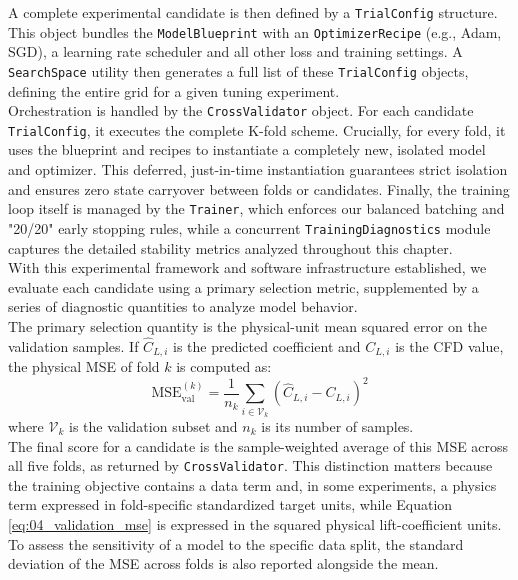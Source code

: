 A complete experimental candidate is then defined by a \texttt{TrialConfig} structure. This object bundles the \texttt{ModelBlueprint} with an \texttt{OptimizerRecipe} (e.g., Adam, SGD), a learning rate scheduler and all other loss and training settings. A \texttt{SearchSpace} utility then generates a full list of these \texttt{TrialConfig} objects, defining the entire grid for a given tuning experiment.\\

Orchestration is handled by the \texttt{CrossValidator} object. For each candidate \texttt{TrialConfig}, it executes the complete K-fold scheme. Crucially, for every fold, it uses the blueprint and recipes to instantiate a completely new, isolated model and optimizer. This deferred, just-in-time instantiation guarantees strict isolation and ensures zero state carryover between folds or candidates. Finally, the training loop itself is managed by the \texttt{Trainer}, which enforces our balanced batching and "20/20" early stopping rules, while a concurrent \texttt{TrainingDiagnostics} module captures the detailed stability metrics analyzed throughout this chapter.\\

With this experimental framework and software infrastructure established, we evaluate each candidate using a primary selection metric, supplemented by a series of diagnostic quantities to analyze model behavior.\\

The primary selection quantity is the physical-unit mean squared error on the validation samples. If $\hat{C}_{L,i}$ is the predicted coefficient and $C_{L,i}$ is the CFD value, the physical MSE of fold $k$ is computed as:
\begin{equation}
    \mathrm{MSE}_{\mathrm{val}}^{(k)} =
    \frac{1}{n_k}\sum_{i\in\mathcal{V}_k}
    \left(\hat{C}_{L,i}-C_{L,i}\right)^2
    \label{eq:04_validation_mse}
\end{equation}
where $\mathcal{V}_k$ is the validation subset and $n_k$ is its number of samples.\\

The final score for a candidate is the sample-weighted 
average of this MSE across all five folds, as returned by \texttt{CrossValidator}. This distinction matters because the training objective contains a data term and, in some experiments, a physics term expressed in fold-specific standardized target units, while Equation \eqref{eq:04_validation_mse} is expressed in the squared physical lift-coefficient units. To assess the sensitivity of a model to the specific data split, the standard deviation of the MSE across folds is also reported alongside the mean.\\

